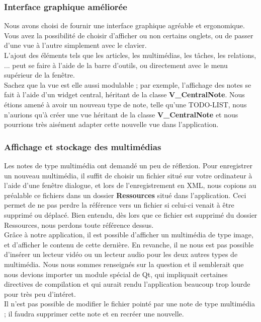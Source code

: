 \documentclass[a4paper]{report}
\begin{document}
\subsubsection{Interface graphique améliorée}
Nous avons choisi de fournir une interface graphique agréable et ergonomique. Vous avez la possibilité de choisir d'afficher ou non certains onglets, ou de passer d'une vue à l'autre simplement avec le clavier.\\
L'ajout des éléments tels que les articles, les multimédias, les tâches, les relations, ... peut se faire à l'aide de la barre d'outils, ou directement avec le menu supérieur de la fenêtre.\\
Sachez que la vue est elle aussi modulable ; par exemple, l'affichage des notes se fait à l'aide d'un widget central, héritant de la classe \textbf{V\_CentralNote}. Nous étions amené à avoir un nouveau type de note, telle qu'une TODO-LIST, nous n'aurions qu'à créer une vue héritant de la classe \textbf{V\_CentralNote} et nous pourrions très aisément adapter cette nouvelle vue dans l'application.

\subsubsection{Affichage et stockage des multimédias}
Les notes de type multimédia ont demandé un peu de réflexion. Pour enregistrer un nouveau multimédia, il suffit de choisir un fichier situé sur votre ordinateur à l'aide d'une fenêtre dialogue, et lors de l'enregistrement en XML, nous copions au préalable ce fichiers dans un dossier \textbf{Ressources} situé dans l'application. Ceci permet de ne pas perdre la référence vers un fichier si celui-ci venait à être supprimé ou déplacé. Bien entendu, dès lors que ce fichier est supprimé du dossier Ressources, nous perdons toute référence dessus.\\
Grâce à notre application, il est possible d'afficher un multimédia de type image, et d'afficher le contenu de cette dernière. En revanche, il ne nous est pas possible d'insérer un lecteur vidéo ou un lecteur audio pour les deux autres types de multimédia. Nous nous sommes renseignés sur la question et il semblerait que nous devions importer un module spécial de Qt, qui impliquait certaines directives de compilation et qui aurait rendu l'application beaucoup trop lourde pour très peu d'intéret.\\
Il n'est pas possible de modifier le fichier pointé par une note de type multimédia ; il faudra supprimer cette note et en recréer une nouvelle.
\end{document}
